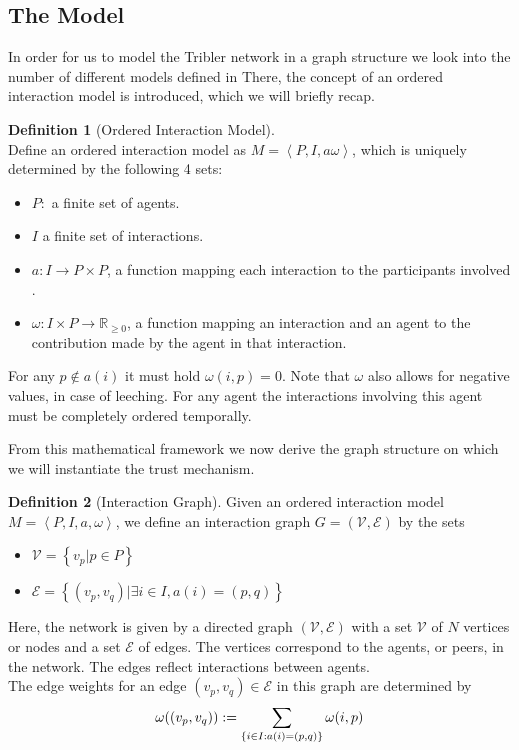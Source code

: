 \documentclass[twocolumn]{article}
\theoremstyle{definition}
\newtheorem{definition}{Definition}[section]
\theoremstyle{theorem}
\begin{document}
\subsection{The Model}
\label{subsec:TheModel}
In order for us to model the Tribler network in a graph structure we look into the number of different models defined in \cite{Sybil-resistant trust mechanisms in distributed systems} There, the concept of an ordered interaction model is introduced, which we will briefly recap.
\begin{definition}[Ordered Interaction Model]\ \\
Define an ordered interaction model as $M=\left\langle P,I,a\omega\right\rangle$, which is uniquely determined by the following 4 sets:
\begin{itemize}
\item $P:$ a finite set of agents.
\item $I$ a finite set of interactions.
\item $a:I\rightarrow{}P\times{}P$, a function mapping each interaction to the participants involved .
\item $\omega:I\times{}P\rightarrow{}\mathbb{R}_{\geq{}0}$, a function mapping an interaction and an agent to the contribution made by the agent in that interaction. \\
\end{itemize}
For any $p\not\in{}a(i)$ it must hold $\omega{}(i,p)=0$. Note that $\omega$ also allows for negative values, in case of leeching. For any agent the interactions involving this agent must be completely ordered temporally. 
\end{definition}
From this mathematical framework we now derive the graph structure on which we will instantiate the trust mechanism. 
\begin{definition}[Interaction Graph]
Given an ordered interaction model $M=\left\langle P,I,a,\omega\right\rangle$, we define an interaction graph $G = (\mathcal{V}, \mathcal{E})$ by the sets
\begin{itemize}
\item $\mathcal{V}=\left\lbrace v_p | p\in{}P\right\rbrace$
\item $\mathcal{E}=\left\lbrace (v_p,v_q) | \exists i\in I, a(i)=(p,q) \right\rbrace$ \vspace{1em}\\
\end{itemize}
Here, the network is given by a directed graph $(\mathcal{V}, \mathcal{E})$ with a set $\mathcal{V}$ of $N$ vertices or nodes and a set $\mathcal{E}$ of edges. The vertices correspond to the agents, or peers, in the network. The edges reflect interactions between agents.\vspace{1em}\\
The edge weights for an edge $(v_p,v_q)\in\mathcal{E}$ in this graph are determined by \vspace{0.3em}\\
\[ 
\omega((v_p, v_q)):=\sum_{\left\lbrace i\in I:a(i)=(p,q)\right\rbrace}\omega(i,p) \vspace{0.6em}\\
\]
\end{definition}
\end{document}
